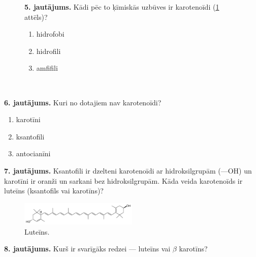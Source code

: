 \documentclass[12pt,a4paper]{article}
\newcommand{\figref}[1]{\ref{#1} attēls}
\begin{document}
\begin{figure}[h]
    \centering
    \begin{minipage}[c]{0.55\textwidth} %
        \textbf{5. jautājums.}  Kādi pēc to ķīmiskās uzbūves ir karotenoīdi (\figref{fig:karotenoidi})?

        \begin{enumerate}[label=\Alph*.]
            \item hidrofobi
            \item hidrofili
            \item amfifili
        \end{enumerate}
    \end{minipage}%
    \hfill
    \begin{minipage}[c]{0.40\textwidth} %
        \centering
        \caption{~}
        \label{fig:karotenoidi}
    \end{minipage}
\end{figure}

\noindent \textbf{6. jautājums.} Kuri no dotajiem nav karotenoīdi?

\begin{enumerate}[label=\Alph*.]
    \item  karotīni
    \item ksantofili
    \item antocianīni
\end{enumerate}

\noindent \textbf{7. jautājums.} Ksantofili ir dzelteni karotenoīdi ar hidroksilgrupām (—OH) un karotīni ir oranži un sarkani bez hidroksilgrupām. Kāda veida karotenoīds ir luteīns (ksantofils vai karotīns)? 

\begin{figure}[H]
    \centering
    \includegraphics[width=0.5\textwidth]{atteli/lutein.png}
    \caption{Luteīns.}
    \label{fig:luteins}
\end{figure}

\noindent \textbf{8. jautājums.} Kurš ir svarīgāks redzei — luteīns vai $\beta$ karotīns? 
\end{document}
